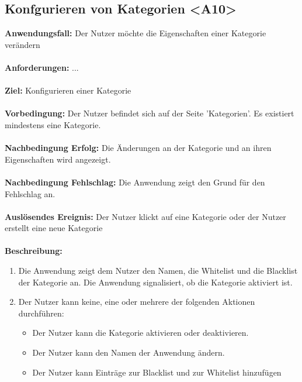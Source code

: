 \documentclass[parskip=full]{scrartcl} %
\begin{document}
\subsection*{Konfgurieren von Kategorien <A10>}
\textbf{Anwendungsfall:} Der Nutzer möchte die Eigenschaften einer Kategorie verändern\\\\
\textbf{Anforderungen:} ...\\\\
\textbf{Ziel:} Konfigurieren einer Kategorie \\\\
\textbf{Vorbedingung:} Der Nutzer befindet sich auf der Seite 'Kategorien'. Es existiert mindestens eine Kategorie.\\\\
\textbf{Nachbedingung Erfolg:} Die Änderungen an der Kategorie und an ihren Eigenschaften wird angezeigt. \\\\
\textbf{Nachbedingung Fehlschlag:} Die Anwendung zeigt den Grund für den Fehlschlag an. \\\\
\textbf{Auslösendes Ereignis:} Der Nutzer klickt auf eine Kategorie oder der Nutzer erstellt eine neue Kategorie \\\\
\textbf{Beschreibung:}
\begin{enumerate}
    \item Die Anwendung zeigt dem Nutzer den Namen, die Whitelist und die Blacklist der Kategorie an. Die Anwendung signalisiert, ob die Kategorie aktiviert ist.
    \item Der Nutzer kann keine, eine oder mehrere der folgenden Aktionen durchführen:
    \begin{itemize}
        \item Der Nutzer kann die Kategorie aktivieren oder deaktivieren.
        \item Der Nutzer kann den Namen der Anwendung ändern.
        \item Der Nutzer kann Einträge zur Blacklist und zur Whitelist hinzufügen
    \end{itemize}
\end{enumerate}
\newpage
\end{document}
